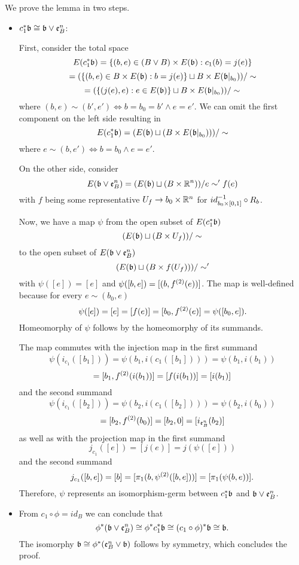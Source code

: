 \begin{myproof}
    We prove the lemma in two steps.
    \begin{itemize}
        \item $c_1^*\mathfrak{b} \cong \mathfrak{b} \vee \mathfrak{e}^{n}_{B}$:
        
        First, consider the total space
        \[ E(c_1^*\mathfrak{b}) = \{(b, e) \in (B \vee B) \times E(\mathfrak{b}):c_1(b) = j(e)\} \]
        \[ = (\{(b, e) \in B \times E(\mathfrak{b}):b = j(e)\} \sqcup B \times E(\mathfrak{b}\vert_{b_0})) / \sim \]
        \[ = (\{(j(e), e):e \in E(\mathfrak{b})\} \sqcup B \times E(\mathfrak{b}\vert_{b_0})) / \sim \]
        where $(b, e) \sim (b', e') \iff b = b_0 = b' \land e = e'$.
        We can omit the first component on the left side resulting in
        \[ E(c_1^*\mathfrak{b}) = (E(\mathfrak{b}) \sqcup (B \times E(\mathfrak{b}\vert_{b_0}))) / \sim \]
        where $e \sim (b, e') \iff b = b_0 \land e = e'$.
        
        On the other side, consider
        \[ E(\mathfrak{b} \vee \mathfrak{e}^{n}_{B}) = (E(\mathfrak{b}) \sqcup (B \times \mathbb{R}^n)) / e \sim' f(e) \]
        with $f$ being some representative
        $U_f \to b_0 \times \mathbb{R}^n$ for $id_{b_0 \times{} [0, 1]}^{-1} \circ R_b$.
        
        Now, we have a map $\psi$ from the open subset of $E(c_1^*\mathfrak{b})$
        \[ (E(\mathfrak{b}) \sqcup (B \times U_f)) / \sim \]
        to the open subset of $E(\mathfrak{b} \vee \mathfrak{e}^{n}_{B})$
        \[ (E(\mathfrak{b}) \sqcup (B \times f(U_f))) / \sim' \]
        with $\psi([e]) = [e]$ and $\psi([b, e]) = [(b, f^{(2)}(e))]$.
        The map is well-defined because for every $e \sim (b_0, e)$
        \[ \psi([e]) = [e] = [f(e)] = [b_0, f^{(2)}(e)] = \psi([b_0, e]). \]
        Homeomorphy of $\psi$ follows by the homeomorphy of its summands.
        
        The map commutes with the injection map in the first summand
        \[ \psi(i_{c_1}([b_1])) = \psi(b_1, i(c_1([b_1]))) = \psi(b_1, i(b_1)) \]
        \[ = [b_1, f^{(2)}(i(b_1))] = [f(i(b_1))] = [i(b_1)] \]
        and the second summand
        \[ \psi(i_{c_1}([b_2])) = \psi(b_2, i(c_1([b_2]))) = \psi(b_2, i(b_0)) \]
        \[ = [b_2, f^{(2)}(b_0)] = [b_2, 0] = [i_{\mathfrak{e}^{n}_{B}}(b_2)] \]
        as well as with the projection map in the first summand
        \[ j_{c_1}([e]) = [j(e)] = j(\psi([e])) \]
        and the second summand
        \[ j_{c_1}([b, e]) = [b] = [\pi_1(b, \psi^{(2)}([b, e]))] = [\pi_1(\psi(b, e))]. \]
        Therefore, $\psi$ represents an isomorphism-germ between $c_1^*\mathfrak{b}$ and $\mathfrak{b} \vee \mathfrak{e}^{n}_{B}$.
    
        \item From $c_1 \circ \phi = id_B$ we can conclude that
        \[ \phi^*(\mathfrak{b} \vee \mathfrak{e}^{n}_{B}) \cong \phi^*c_1^*\mathfrak{b} \cong (c_1 \circ \phi)^*\mathfrak{b} \cong \mathfrak{b}. \]
        The isomorphy $\mathfrak{b} \cong \phi^*(\mathfrak{e}^{n}_{B} \vee \mathfrak{b})$ follows by symmetry,
        which concludes the proof.
    \end{itemize}
\end{myproof}


